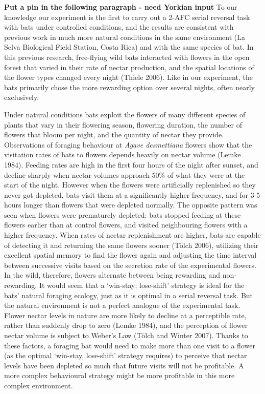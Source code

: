 \documentclass[
]{article}
\begin{document}
\textbf{Put a pin in the following paragraph - need Yorkian input} To our knowledge our experiment is the first to carry out a 2-AFC serial reversal task with bats under controlled conditions, and the results are consistent with previous work in much more natural conditions in the same environment (La Selva Biological Field Station, Costa Rica) and with the same species of bat. In this previous research, free-flying wild bats interacted with flowers in the open forest that varied in their rate of nectar production, and the spatial locations of the flower types changed every night (Thiele 2006). Like in our experiment, the bats primarily chose the more rewarding option over several nights, often nearly exclusively.

Under natural conditions bats exploit the flowers of many different species of plants that vary in their flowering season, flowering duration, the number of flowers that bloom per night, and the quantity of nectar they provide. Observations of foraging behaviour at \emph{Agave desmettiana} flowers show that the visitation rates of bats to flowers depends heavily on nectar volume (Lemke 1984). Feeding rates are high in the first four hours of the night after sunset, and decline sharply when nectar volumes approach 50\% of what they were at the start of the night. However when the flowers were artificially replenished so they never got depleted, bats visit them at a significantly higher frequency, and for 3-5 hours longer than flowers that were depleted normally. The opposite pattern was seen when flowers were prematurely depleted: bats stopped feeding at these flowers earlier than at control flowers, and visited neighbouring flowers with a higher frequency. When rates of nectar replenishment are higher, bats are capable of detecting it and returning the same flowers sooner (Tölch 2006), utilizing their excellent spatial memory to find the flower again and adjusting the time interval between successive visits based on the secretion rate of the experimental flowers. In the wild, therefore, flowers alternate between being rewarding and non-rewarding. It would seem that a `win-stay; lose-shift' strategy is ideal for the bats' natural foraging ecology, just as it is optimal in a serial reversal task. But the natural environment is not a perfect analogue of the experimental task. Flower nectar levels in nature are more likely to decline at a perceptible rate, rather than suddenly drop to zero (Lemke 1984), and the perception of flower nectar volume is subject to Weber's Law (Tölch and Winter 2007). Thanks to these factors, a foraging bat would need to make more than one visit to a flower (as the optimal `win-stay, lose-shift' strategy requires) to perceive that nectar levels have been depleted so much that future visits will not be profitable. A more complex behavioural strategy might be more profitable in this more complex environment.
\end{document}
